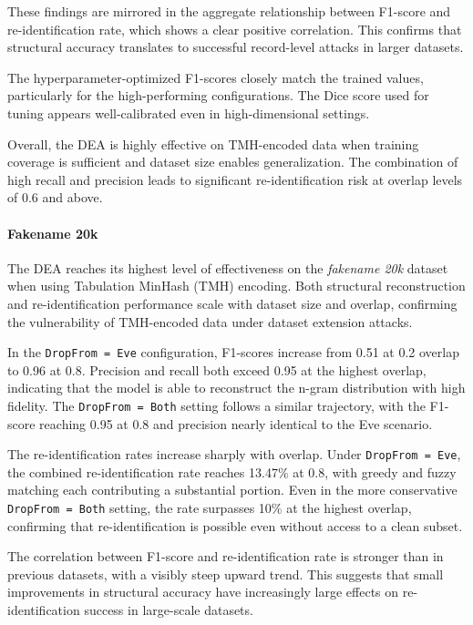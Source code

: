 These findings are mirrored in the aggregate relationship between F1-score and re-identification rate, which shows a clear positive correlation. This confirms that structural accuracy translates to successful record-level attacks in larger datasets.

The hyperparameter-optimized F1-scores closely match the trained values, particularly for the high-performing configurations. The Dice score used for tuning appears well-calibrated even in high-dimensional settings.

Overall, the DEA is highly effective on TMH-encoded data when training coverage is sufficient and dataset size enables generalization. The combination of high recall and precision leads to significant re-identification risk at overlap levels of 0.6 and above.


\paragraph{Fakename 20k}

The DEA reaches its highest level of effectiveness on the \textit{fakename 20k} dataset when using Tabulation MinHash (TMH) encoding. Both structural reconstruction and re-identification performance scale with dataset size and overlap, confirming the vulnerability of TMH-encoded data under dataset extension attacks.

In the \texttt{DropFrom = Eve} configuration, F1-scores increase from 0.51 at 0.2 overlap to 0.96 at 0.8. Precision and recall both exceed 0.95 at the highest overlap, indicating that the model is able to reconstruct the n-gram distribution with high fidelity. The \texttt{DropFrom = Both} setting follows a similar trajectory, with the F1-score reaching 0.95 at 0.8 and precision nearly identical to the Eve scenario.

The re-identification rates increase sharply with overlap. Under \texttt{DropFrom = Eve}, the combined re-identification rate reaches 13.47\% at 0.8, with greedy and fuzzy matching each contributing a substantial portion. Even in the more conservative \texttt{DropFrom = Both} setting, the rate surpasses 10\% at the highest overlap, confirming that re-identification is possible even without access to a clean subset.

The correlation between F1-score and re-identification rate is stronger than in previous datasets, with a visibly steep upward trend. This suggests that small improvements in structural accuracy have increasingly large effects on re-identification success in large-scale datasets.


